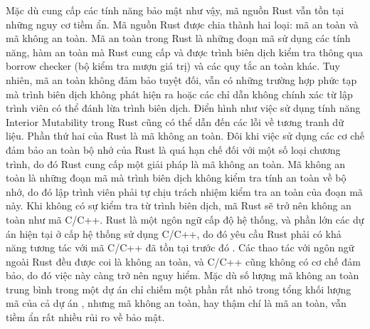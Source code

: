 Mặc dù cung cấp các tính năng bảo mật như vậy, mã nguồn Rust vẫn tồn tại những nguy cơ tiềm ẩn.
Mã nguồn Rust được chia thành hai loại: mã an toàn và mã không an toàn.
Mã an toàn trong Rust là những đoạn mã sử dụng các tính năng, hàm an toàn mà Rust cung cấp và được trình biên dịch kiểm tra thông qua borrow checker (bộ kiểm tra mượn giá trị) \cite{rustlangBorrowingRust} và các quy tắc an toàn khác.
Tuy nhiên, mã an toàn không đảm bảo tuyệt đối, vẫn có những trường hợp phức tạp mà trình biên dịch không phát hiện ra hoặc các chỉ dẫn không chính xác từ lập trình viên có thể đánh lừa trình biên dịch.
Điển hình như việc sử dụng tính năng Interior Mutability \cite{poli2024reasoning} trong Rust cũng có thể dẫn đến các lỗi về tương tranh dữ liệu.
Phần thứ hai của Rust là mã không an toàn.
Đôi khi việc sử dụng các cơ chế đảm bảo an toàn bộ nhớ của Rust là quá hạn chế đối với một số loại chương trình, do đó Rust cung cấp một giải pháp là mã không an toàn.
Mã không an toàn là những đoạn mã mà trình biên dịch không kiểm tra tính an toàn về bộ nhớ, do đó lập trình viên phải tự chịu trách nhiệm kiểm tra an toàn của đoạn mã này.
Khi không có sự kiểm tra từ trình biên dịch, mã Rust sẽ trở nên không an toàn như mã C/C++.
Rust là một ngôn ngữ cấp độ hệ thống, và phần lớn các dự án hiện tại ở cấp hệ thống sử dụng C/C++, do đó yêu cầu Rust phải có khả năng tương tác với mã C/C++ đã tồn tại trước đó \cite{sharma2023rust}.
Các thao tác với ngôn ngữ ngoài Rust đều được coi là không an toàn, và C/C++ cũng không có cơ chế đảm bảo, do đó việc này càng trở nên nguy hiểm.
Mặc dù số lượng mã không an toàn trung bình trong một dự án chỉ chiếm một phần rất nhỏ trong tổng khối lượng mã của cả dự án \cite{zheng2023closer}, nhưng mã không an toàn, hay thậm chí là mã an toàn, vẫn tiềm ẩn rất nhiều rủi ro về bảo mật.


